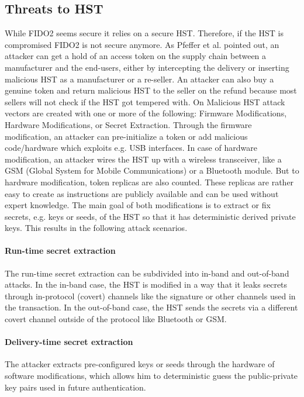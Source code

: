 \documentclass[runningheads]{llncs}
\begin{document}
\subsection{Threats to HST}
While FIDO2 seems secure it relies on a secure HST. Therefore, if the HST is compromised FIDO2 is not secure anymore. As Pfeffer et al. pointed out, an attacker can get a hold of an access token on the supply chain between a manufacturer and the end-users, either by intercepting the delivery or inserting malicious HST as a manufacturer or a re-seller. An attacker can also buy a genuine token and return malicious HST to the seller on the refund because most sellers will not check if the HST got tempered with. On Malicious HST attack vectors are created with one or more of the following: Firmware Modifications, Hardware Modifications, or Secret Extraction. Through the firmware modification, an attacker can pre-initialize a token or add malicious code/hardware which exploits e.g. USB interfaces. In case of hardware modification, an attacker wires the HST up with a wireless transceiver, like a GSM (Global System for Mobile Communications) or a Bluetooth module. But to hardware modification, token replicas are also counted. These replicas are rather easy to create as instructions are publicly available and can be used without expert knowledge. The main goal of both modifications is to extract or fix secrets, e.g. keys or seeds, of the HST so that it has deterministic derived private keys. \cite{272198} This results in the following attack scenarios.

\paragraph{Run-time secret extraction}
The run-time secret extraction can be subdivided into in-band and out-of-band attacks. In the in-band case, the HST is modified in a way that it leaks secrets through in-protocol (covert) channels like the signature or other channels used in the transaction. In the out-of-band case, the HST sends the secrets via a different covert channel outside of the protocol like Bluetooth or GSM.

\paragraph{Delivery-time secret extraction}
The attacker extracts pre-configured keys or seeds through the hardware of software modifications, which allows him to deterministic guess the public-private key pairs used in future authentication.
\end{document}
